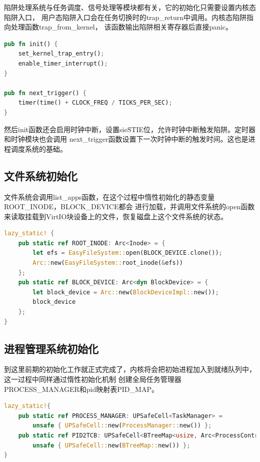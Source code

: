 陷阱处理系统与任务调度、信号处理等模块都有关，它的初始化只需要设置内核态陷阱入口，
用户态陷阱入口会在任务切换时的trap\_return中调用。内核态陷阱指向处理函数trap\_from\_kernel，
该函数输出陷阱相关寄存器后直接panic。

\begin{lstlisting}[language=Rust,caption={陷阱处理系统初始化与时钟中断设置}, label={lst:trap-timer-init}]
pub fn init() {
    set_kernel_trap_entry();
    enable_timer_interrupt();
}

pub fn next_trigger() {
    timer(time() + CLOCK_FREQ / TICKS_PER_SEC);
}
\end{lstlisting}

然后init函数还会启用时钟中断，设置sie\.STIE位，允许时钟中断触发陷阱。定时器和时钟模块也会调用
next\_trigger函数设置下一次时钟中断的触发时间。这也是进程调度系统的基础。

\subsection{文件系统初始化}
文件系统会调用list\_apps函数，在这个过程中惰性初始化的静态变量ROOT\_INODE，BLOCK\_DEVICE都会
进行加载，并调用文件系统的open函数来读取挂载到VirtIO块设备上的文件，恢复磁盘上这个文件系统的状态。

\begin{lstlisting}[language=Rust,caption={文件系统初始化}, label={lst:filesystem-init}]
lazy_static! {
    pub static ref ROOT_INODE: Arc<Inode> = {
        let efs = EasyFileSystem::open(BLOCK_DEVICE.clone());
        Arc::new(EasyFileSystem::root_inode(&efs))
    };
    pub static ref BLOCK_DEVICE: Arc<dyn BlockDevice> = {
        let block_device = Arc::new(BlockDeviceImpl::new());
        block_device
    };
}
\end{lstlisting}

\subsection{进程管理系统初始化}

到这里前期的初始化工作就正式完成了，内核将会把初始进程加入到就绪队列中，这一过程中同样通过惰性初始化机制
创建全局任务管理器PROCESS\_MANAGER和pid映射表PID\_MAP。

\begin{lstlisting}[language=Rust,caption={进程管理系统初始化}, label={lst:process-manager-init}]
lazy_static!{
    pub static ref PROCESS_MANAGER: UPSafeCell<TaskManager> =
        unsafe { UPSafeCell::new(ProcessManager::new()) };
    pub static ref PID2TCB: UPSafeCell<BTreeMap<usize, Arc<ProcessControlBlock>>> =
        unsafe { UPSafeCell::new(BTreeMap::new()) };
}
\end{lstlisting}

